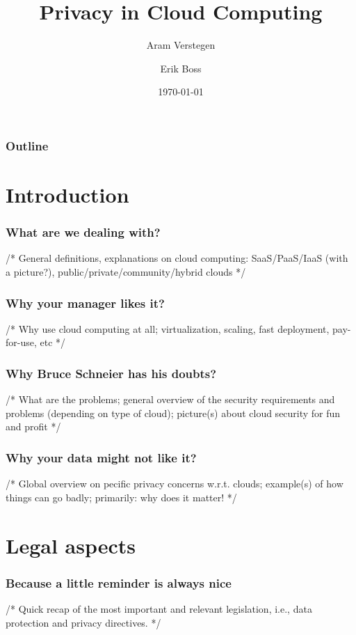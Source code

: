 \documentclass{beamer}
\title{Privacy in Cloud Computing}
\author{Aram Verstegen \and Erik Boss}
\institute{Radboud University Nijmegen}
\date{\today}
\begin{document}
\begin{frame}
  \titlepage
\end{frame}

\begin{frame}
  \frametitle{Outline}
  \tableofcontents
\end{frame}


\section{Introduction}

\begin{frame}
    \frametitle{What are we dealing with?}
    /* General definitions, explanations on cloud computing: SaaS/PaaS/IaaS
    (with a picture?), public/private/community/hybrid clouds  */
\end{frame}

\begin{frame}
    \frametitle{Why your manager likes it?}
    /* Why use cloud computing at all; virtualization, scaling, fast
    deployment, pay-for-use, etc  */
\end{frame}

\begin{frame}
    \frametitle{Why Bruce Schneier has his doubts?}
    /* What are the problems; general overview of the security requirements and
    problems (depending on type of cloud); picture(s) about cloud security for
    fun and profit */
\end{frame}

\begin{frame}
    \frametitle{Why your data might not like it?}
    /* Global overview on pecific privacy concerns w.r.t. clouds; example(s)
    of how things can go badly; primarily: why does it matter! */
\end{frame}

\section{Legal aspects}

\begin{frame}
    \frametitle{Because a little reminder is always nice}
    /* Quick recap of the most important and relevant legislation, i.e., data
    protection and privacy directives. */
\end{frame}
\end{document}

